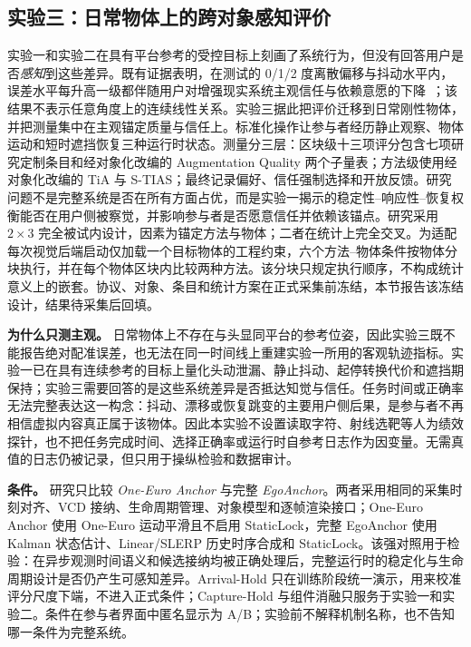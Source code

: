 \documentclass[review]{vgtc}
\begin{document}
\subsection{实验三：日常物体上的跨对象感知评价}

实验一和实验二在具有平台参考的受控目标上刻画了系统行为，但没有回答用户是否\emph{感知}到这些差异。既有证据表明，在测试的 0/1/2 度离散偏移与抖动水平内，误差水平每升高一级都伴随用户对增强现实系统主观信任与依赖意愿的下降~\cite{gottsacker2024artrust}；该结果不表示任意角度上的连续线性关系。实验三据此把评价迁移到日常刚性物体，并把测量集中在主观锚定质量与信任上。标准化操作让参与者经历静止观察、物体运动和短时遮挡恢复三种运行时状态。测量分三层：区块级十三项评分包含七项研究定制条目和经对象化改编的 Augmentation Quality 两个子量表；方法级使用经对象化改编的 TiA 与 S-TIAS；最终记录偏好、信任强制选择和开放反馈。研究问题不是完整系统是否在所有方面占优，而是实验一揭示的稳定性--响应性--恢复权衡能否在用户侧被察觉，并影响参与者是否愿意信任并依赖该锚点。研究采用 $2 \times 3$ 完全被试内设计，因素为锚定方法与物体；二者在统计上完全交叉。为适配每次视觉后端启动仅加载一个目标物体的工程约束，六个方法--物体条件按物体分块执行，并在每个物体区块内比较两种方法。该分块只规定执行顺序，不构成统计意义上的嵌套。协议、对象、条目和统计方案在正式采集前冻结，本节报告该冻结设计，结果待采集后回填。

\textbf{为什么只测主观。} 日常物体上不存在与头显同平台的参考位姿，因此实验三既不能报告绝对配准误差，也无法在同一时间线上重建实验一所用的客观轨迹指标。实验一已在具有连续参考的目标上量化头动泄漏、静止抖动、起停转换代价和遮挡期保持；实验三需要回答的是这些系统差异是否抵达知觉与信任。任务时间或正确率无法完整表达这一构念：抖动、漂移或恢复跳变的主要用户侧后果，是参与者不再相信虚拟内容真正属于该物体。因此本实验不设置读取字符、射线选靶等人为绩效探针，也不把任务完成时间、选择正确率或运行时自参考日志作为因变量。无需真值的日志仍被记录，但只用于操纵检验和数据审计。

\textbf{条件。} 研究只比较 \emph{One-Euro Anchor} 与完整 \emph{EgoAnchor}。两者采用相同的采集时刻对齐、VCD 接纳、生命周期管理、对象模型和逐帧渲染接口；One-Euro Anchor 使用 One-Euro 运动平滑且不启用 StaticLock，完整 EgoAnchor 使用 Kalman 状态估计、Linear/SLERP 历史时序合成和 StaticLock。该强对照用于检验：在异步观测时间语义和候选接纳均被正确处理后，完整运行时的稳定化与生命周期设计是否仍产生可感知差异。Arrival-Hold 只在训练阶段统一演示，用来校准评分尺度下端，不进入正式条件；Capture-Hold 与组件消融只服务于实验一和实验二。条件在参与者界面中匿名显示为 A/B；实验前不解释机制名称，也不告知哪一条件为完整系统。
\end{document}
